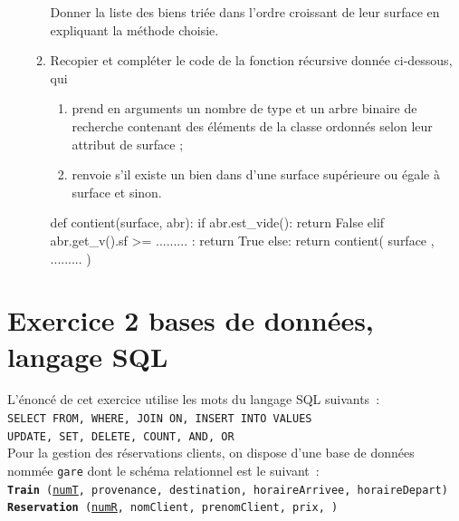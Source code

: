 \documentclass[a4paper,12pt,french]{book}
\begin{document}
\begin{enumerate}[\bfseries 1.]
\begin{enumerate}[\bfseries a.]
                    Donner la liste des biens triée dans l'ordre croissant de leur surface en expliquant la méthode choisie.
             \item 	Recopier et compléter le code de la fonction récursive  donnée ci-dessous, qui
             \begin{enumerate}[--]
                 \item 	prend en arguments un nombre  de type  et un arbre binaire de recherche  contenant des éléments de la classe  ordonnés selon leur attribut de surface  ;
                 \item 	renvoie  s'il existe un bien dans  d'une
                 surface supérieure ou égale à surface et  sinon.
             \end{enumerate}
\begin{pythoncode}
def contient(surface, abr):
    if abr.est_vide():
        return False
    elif abr.get_v().sf >= ......... :
        return True
    else:
        return contient( surface , ......... )
\end{pythoncode}
         \end{enumerate}
    \end{enumerate}


\section*{Exercice 2 \small{\hfill bases de données, langage SQL}}

    L’énoncé de cet exercice utilise les mots du langage SQL suivants :\\

    \texttt{SELECT FROM, WHERE, JOIN ON, INSERT INTO VALUES}\\
    \texttt{UPDATE, SET, DELETE, COUNT, AND, OR}\\

    Pour la gestion des réservations clients, on dispose d’une base de données nommée \texttt{gare} dont le schéma relationnel est le suivant :\\

    \texttt{\textbf{Train} (\uline{numT}, provenance, destination, horaireArrivee, horaireDepart)}\\

    \texttt{\textbf{Reservation} (\uline{numR}, nomClient, prenomClient, prix, )}\\
\end{document}
